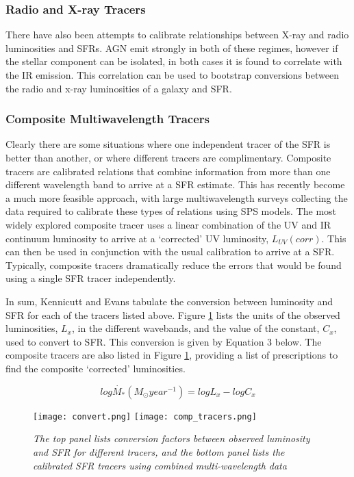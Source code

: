 \documentclass{literature}
\begin{document}
\subsubsection{Radio and X-ray Tracers}\label{subsubsec:rad_x}
There have also been attempts to calibrate relationships between X-ray and radio luminosities and SFRs. AGN emit strongly in both of these regimes, however if the stellar component can be isolated, in both cases it is found to correlate with the IR emission. This correlation can be used to bootstrap conversions between the radio and x-ray luminosities of a galaxy and SFR.

\subsubsection{Composite Multiwavelength Tracers}\label{subsubsec:comp}
Clearly there are some situations where one independent tracer of the SFR is better than another, or where different tracers are complimentary. Composite tracers are calibrated relations that combine information from more than one different wavelength band to arrive at a SFR estimate. This has recently become a much more feasible approach, with large multiwavelength surveys collecting the data required to calibrate these types of relations using SPS models. The most widely explored composite tracer uses a linear combination of the UV and IR continuum luminosity to arrive at a `corrected' UV luminosity, $L_{UV}(corr)$. This can then be used in conjunction with the usual calibration to arrive at a SFR. Typically, composite tracers dramatically reduce the errors that would be found using a single SFR tracer independently.   


In sum, Kennicutt and Evans \citep{Kennicutt_2012} tabulate the conversion between luminosity and SFR for each of the tracers listed above. Figure \ref{fig:comp_convert} lists the units of the observed luminosities, $L_{x}$, in the different wavebands, and the value of the constant, $C_{x}$, used to convert to SFR. This conversion is given by Equation 3 below. The composite tracers are also listed in Figure \ref{fig:comp_convert}, providing a list of prescriptions to find the composite `corrected' luminosities. 

\begin{equation} \label{eq:convert}	
	log\dot{M_{*}}(M_{\odot}year^{-1}) = logL_{x} - logC_{x}
\end{equation}



\begin{figure}[!htp]
\centering
\texttt{[image: convert.png]}
\texttt{[image: comp\_tracers.png]}
\caption{\footnotesize{\emph{The top panel lists conversion factors between observed luminosity and SFR for different tracers, and the bottom panel lists the calibrated SFR tracers using combined multi-wavelength data}}}
\label{fig:comp_convert}
\end{figure} 
\end{document}
